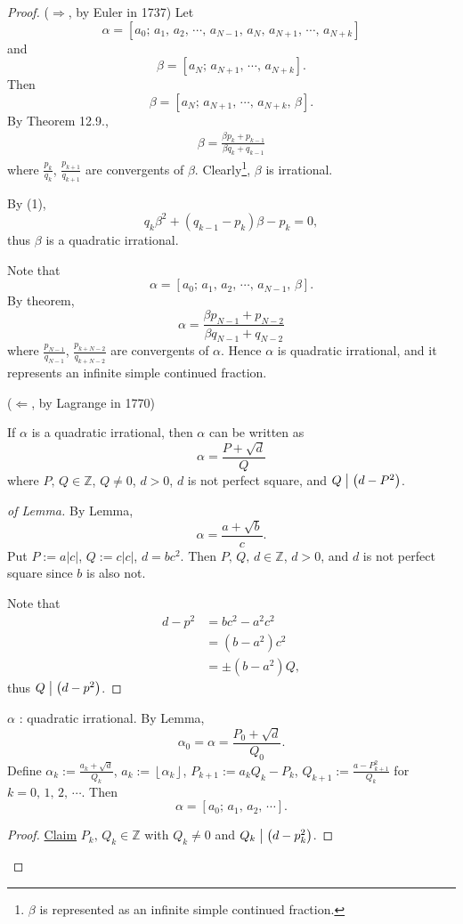 \begin{proof}
    ($\Rightarrow$, by Euler in 1737) Let
    \[\alpha=\left[ a_0;\,a_1,\,a_2,\,\cdots,\,a_{N-1},\,a_{N},\,a_{N+1},\,\cdots,\,a_{N+k} \right]\]
    and
    \[\beta=\left[ a_{N};\,a_{N+1},\,\cdots,\,a_{N+k} \right].\]
    Then
    \[\beta=\left[ a_{N};\,a_{N+1},\,\cdots,\,a_{N+k},\,\beta \right].\]
    By Theorem 12.9.,
    \begin{align}
        \beta=\frac{\beta p_k+p_{k-1}}{\beta q_k+q_{k-1}}
    \end{align}
    where $\frac{p_k}{q_k}$, $\frac{p_{k+1}}{q_{k+1}}$ are convergents of $\beta$.
    Clearly\footnote{$\beta$ is represented as an infinite simple continued fraction.},
    $\beta$ is irrational.

    By (1),
    \[
        q_k \beta^2 + \left(q_{k-1}-p_k\right)\beta - p_k=0,
    \]
    thus $\beta$ is a quadratic irrational.

    Note that
    \[
        \alpha = \left[ a_0;\,a_1,\,a_2,\,\cdots,\,a_{N-1},\,\beta \right].
    \]
    By theorem,
    \[
        \alpha = \frac{\beta p_{N-1}+p_{N-2}}{\beta q_{N-1}+q_{N-2}} 
    \]
    where $\frac{p_{N-1}}{q_{N-1}}$, $\frac{p_{k+{N-2}}}{q_{k+{N-2}}}$ are convergents of $\alpha$.
    Hence $\alpha$ is quadratic irrational, and it represents an infinite simple continued fraction.

    ($\Leftarrow$, by Lagrange in 1770)
    \begin{lemma}
        If $\alpha$ is a quadratic irrational, then $\alpha$ can be written as
        \[
            \alpha = \frac{P+\sqrt{d}}{Q}
        \]
        where $P,\,Q \in \mathbb{Z}$, $Q\neq 0$, $d > 0$, $d$ is not perfect square,
        and $Q \bigm| \left(d-P^2\right)$.
    \end{lemma}
    \begin{proof}[of Lemma]
        By Lemma,
        \[
            \alpha = \frac{a+\sqrt{b}}{c}.
        \]
        Put $P:=a\left|c\right|$, $Q:=c\left|c\right|$, $d=bc^2$. Then
        $P,\,Q,\,d\in\mathbb{Z}$, $d>0$, and $d$ is not perfect square since $b$ is also not.

        Note that
        \begin{align*}
            d-p^2 &= bc^2 - a^2c^2 \\
            &= \left(b-a^2\right)c^2 \\
            &= \pm \left(b-a^2\right)Q,
        \end{align*}
        thus $Q \bigm| \left(d-p^2\right)$.
    \end{proof}
    \begin{theorem}
        $\alpha$ : quadratic irrational. By Lemma,
        \[
            \alpha_0=\alpha=\frac{P_0+\sqrt{d}}{Q_0}.
        \]
        Define $\alpha_k:=\frac{a_k+\sqrt{d}}{Q_k}$, $a_k:=\left\lfloor \alpha_k\right\rfloor$,
        $P_{k+1}:=a_kQ_k-P_k$, $Q_{k+1}:=\frac{a-P_{k+1}^2}{Q_k}$ for $k=0,\,1,\,2,\,\cdots$.
        Then
        \[
            \alpha=\left[a_0;\,a_1,\,a_2,\,\cdots\right].
        \]
    \end{theorem}
    \begin{proof}
        \underline{Claim} $P_k,\,Q_k \in \mathbb{Z}$ with $Q_k \neq 0$ and $Q_k \bigm| \left(d-p_k^2\right)$.


\end{proof}
\end{proof}
